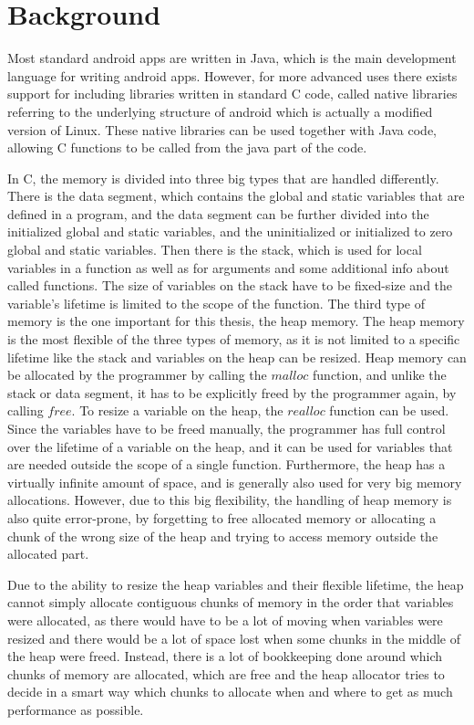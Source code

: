 \documentclass[a4paper,11pt,oneside]{report}
\begin{document}
\chapter{Background}

Most standard android apps are written in Java, which is the main development
language for writing android apps. However, for more advanced uses there exists
support for including libraries written in standard C code, called native libraries
referring to the underlying structure of android which is actually a modified
version of Linux. These native libraries can be used together with Java code,
allowing C functions to be called from the java part of the code.

In C, the memory is divided into three big types that are handled differently.
There is the data segment, which contains the global and static variables that
are defined in a program, and the data segment can be further divided into the
initialized global and static variables, and the uninitialized or initialized to
zero global and static variables.
Then there is the stack, which is used for local variables in a function as well
as for arguments and some additional info about called functions. The size of
variables on the stack have to be fixed-size and the variable's lifetime is
limited to the scope of the function.
The third type of memory is the one important for this thesis, the heap memory.
The heap memory is the most flexible of the three types of memory, as it is not
limited to a specific lifetime like the stack and variables on the heap can be
resized. Heap memory can be allocated by the programmer by calling the $malloc$
function, and unlike the stack or data segment, it has to be explicitly freed by
the programmer again, by calling $free$. To resize a variable on the heap, the
$realloc$ function can be used. Since the variables have to be freed manually,
the programmer has full control over the lifetime of a variable on the heap, and
it can be used for variables that are needed outside the scope of a single
function. Furthermore, the heap has a virtually infinite amount of space, and is
generally also used for very big memory allocations. However, due to this big
flexibility, the handling of heap memory is also quite error-prone, by forgetting
to free allocated memory or allocating a chunk of the wrong size of the heap and
trying to access memory outside the allocated part.

Due to the ability to resize the heap variables and their flexible lifetime, the
heap cannot simply allocate contiguous chunks of memory in the order that variables
were allocated, as there would have to be a lot of moving when variables were
resized and there would be a lot of space lost when some chunks in the middle of
the heap were freed. Instead, there is a lot of bookkeeping done around which
chunks of memory are allocated, which are free and the heap allocator tries to
decide in a smart way which chunks to allocate when and where to get as much
performance as possible.
\end{document}
